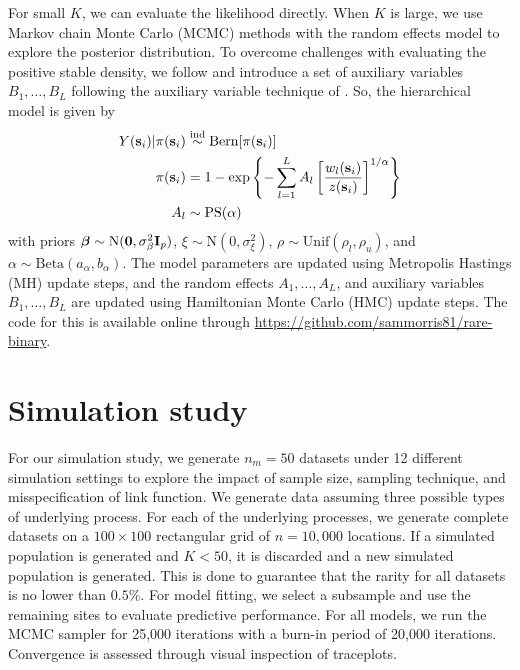 \documentclass[12pt]{article}
\begin{document}
For small $K$, we can evaluate the likelihood directly.
When $K$ is large, we use Markov chain Monte Carlo (MCMC) methods with the random effects model to explore the posterior distribution.
To overcome challenges with evaluating the positive stable density, we follow \citet{Reich2012} and introduce a set of auxiliary variables $B_1, \ldots, B_L$ following the auxiliary variable technique of \citet{Stephenson2009} \citep[see Appendix A.3]{Reich2012}.
So, the hierarchical model is given by
\begin{align}
Y(\mathbf{s}_i) | \pi(\mathbf{s}_i) &\stackrel{\mathrm{ind}}{\sim} \text{Bern}[\pi(\mathbf{s}_i)] \\
\pi(\mathbf{s}_i) &= 1 - \exp \left\{ -\displaystyle \sum_{ l = 1 }^{L} A_l \left[ \frac{ w_{l}(\mathbf{s}_i) }{ z(\mathbf{s}_i) } \right]^{ 1/\alpha} \right\} \nonumber\\
A_l &\sim \text{PS}(\alpha) \nonumber
\end{align}
with priors $\mbox{\boldmath $\beta$} \sim \text{N}(\mathbf{0}, \sigma^2_\beta \mathbf{I}_p )$, $\xi \sim \text{N}(0, \sigma^2_\xi)$, $\rho \sim \text{Unif}(\rho_l, \rho_u)$, and $\alpha \sim \text{Beta}(a_\alpha, b_\alpha)$.
The model parameters are updated using Metropolis Hastings (MH) update steps, and the random effects $A_1, \ldots, A_L$, and auxiliary variables $B_1, \ldots, B_L$ are updated using Hamiltonian Monte Carlo (HMC) update steps.
The code for this is available online through \url{https://github.com/sammorris81/rare-binary}.

\section{Simulation study}\label{rbs:sim}

For our simulation study, we generate $n_m = 50$ datasets under 12 different simulation settings to explore the impact of sample size, sampling technique, and misspecification of link function.
We generate data assuming three possible types of underlying process.
For each of the underlying processes, we generate complete datasets on a $100 \times 100$ rectangular grid of $n = 10,000$ locations.
If a simulated population is generated and $K < 50$, it is discarded and a new simulated population is generated.
This is done to guarantee that the rarity for all datasets is no lower than $0.5\%$.
For model fitting, we select a subsample and use the remaining sites to evaluate predictive performance.
For all models, we run the MCMC sampler for 25,000 iterations with a burn-in period of 20,000 iterations.
Convergence is assessed through visual inspection of traceplots.
\end{document}
